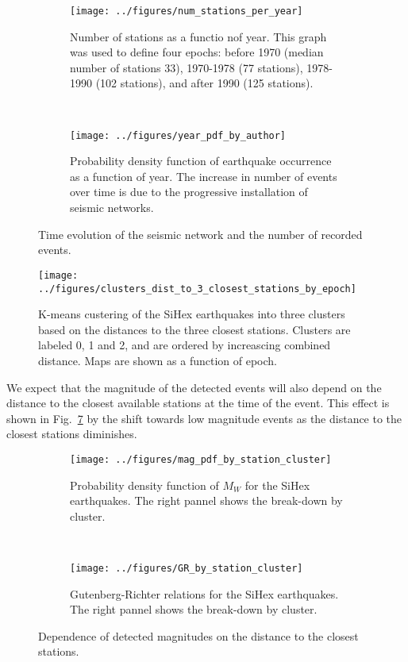 \begin{figure}
\centering
\begin{subfigure}[t]{0.95\textwidth}
	\centering
	\texttt{[image: ../figures/num\_stations\_per\_year]}
	\caption{Number of stations as a functio nof year. This graph was used
	to define four epochs: before 1970 (median number of stations 33),
	1970-1978 (77 stations), 1978-1990 (102 stations), and after 1990 (125
	stations).} 
	\label{fg:stations_by_year}
\end{subfigure}
~
\begin{subfigure}[t]{0.95\textwidth}
	\centering
	\texttt{[image: ../figures/year\_pdf\_by\_author]}
	\caption{Probability density function of earthquake occurrence as a
	function of year. The increase in number of events over time is due to
	the progressive installation of seismic networks.}
	\label{fg:events_by_year}
\end{subfigure}
\caption{Time evolution of the seismic network and the number of recorded
events.}
\label{fg:network_evolution}
\end{figure}

\begin{figure}
\centering
\texttt{[image: ../figures/clusters\_dist\_to\_3\_closest\_stations\_by\_epoch]}
\caption{K-means custering of the SiHex earthquakes into three clusters based
on the distances to the three closest stations. Clusters are labeled 0, 1 and
2, and are ordered by increascing combined distance. Maps are shown as a
function of epoch.}
\label{fg:station_clusters}
\end{figure}

We expect that the magnitude of the detected events will also depend on the
distance to the closest available stations at the time of the event. This
effect is shown in Fig.~\ref{fg:mag_by_cluster} by the shift towards low
magnitude events as the distance to the closest stations diminishes.

\begin{figure}
\centering
\begin{subfigure}[t]{\textwidth}
	\centering
	\texttt{[image: ../figures/mag\_pdf\_by\_station\_cluster]}
	\caption{Probability density function of $M_W$ for the SiHex
	earthquakes. The right pannel shows the break-down by cluster.
	} 
	\label{fg:hist_mag_by_cluster}
\end{subfigure}
~
\begin{subfigure}[t]{\textwidth}
	\centering
	\texttt{[image: ../figures/GR\_by\_station\_cluster]}
	\caption{Gutenberg-Richter relations for the SiHex earthquakes. The
	right pannel shows the break-down by cluster.}
	\label{fg:GR_by_cluster}
\end{subfigure}
\caption{Dependence of detected magnitudes on the distance to the closest
stations.}
\label{fg:mag_by_cluster}
\end{figure}

